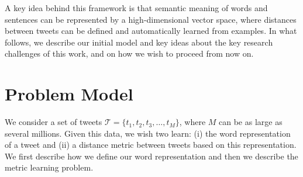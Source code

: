 \documentclass[letterpaper]{article}
\begin{document}
A key idea behind this framework is that semantic meaning of words and sentences can be represented by a high-dimensional vector space, where distances between tweets can be defined and automatically learned from examples. In what follows, we describe our initial model and key ideas about the key research challenges of this work, and on how we wish to proceed from now on. 





\section{Problem Model}

We consider a set of tweets $\mathcal{T} = \{ t_1, t_2, t_3, \dots, t_M \}$, where $M$ can be as large as several millions. Given this data, we wish two learn: (i) the word representation of a tweet and (ii) a distance metric between tweets based on this representation. We first describe how we define our word representation and then we describe the metric learning problem.
\end{document}
